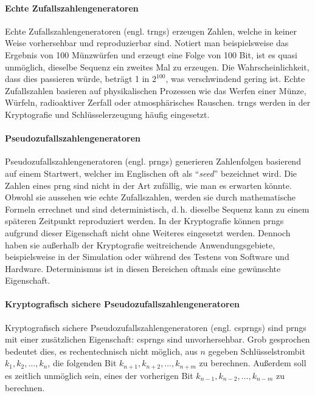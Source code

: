 \paragraph{Echte Zufallszahlengeneratoren}
Echte Zufallszahlengeneratoren (engl. \acp{trng})
erzeugen Zahlen, welche in keiner Weise vorhersehbar und reproduzierbar sind. Notiert man
beispielsweise das Ergebnis von 100 Münzwürfen und erzeugt eine Folge von 100 Bit, ist es quasi
unmöglich, dieselbe Sequenz ein zweites Mal zu erzeugen. Die Wahrscheinlichkeit,
dass dies passieren würde, beträgt 1 in $2^{100}$, was verschwindend gering ist.
Echte Zufallszahlen basieren auf physikalischen Prozessen wie das Werfen einer Münze, Würfeln,
radioaktiver Zerfall oder atmosphärisches Rauschen. \acp{trng} werden in der Kryptografie und
Schlüsselerzeugung häufig eingesetzt.

\paragraph{Pseudozufallszahlengeneratoren}
Pseudozufallszahlengeneratoren (engl. \acp{prng})
generieren Zahlenfolgen basierend auf einem Startwert, welcher im Englischen oft als
\enquote{\textit{seed}} bezeichnet wird. Die Zahlen eines \ac{prng} sind nicht
in der Art zufällig, wie man es erwarten könnte.
Obwohl sie aussehen wie echte Zufallszahlen, werden sie durch
mathematische Formeln errechnet und sind deterministisch, d.\,h. dieselbe Sequenz
kann zu einem späteren Zeitpunkt reproduziert werden.
In der Kryptografie können \acp{prng} aufgrund dieser Eigenschaft
nicht ohne Weiteres eingesetzt werden.
Dennoch haben sie außerhalb der Kryptografie weitreichende Anwendungsgebiete,
beispielsweise in der Simulation oder während des Testens von Software und Hardware.
Determinismus ist in diesen Bereichen oftmals eine gewünschte Eigenschaft.

\paragraph{Kryptografisch sichere Pseudozufallszahlengeneratoren}
Kryptografisch sichere Pseudozufallszahlengeneratoren
(engl. \acp{csprng}) sind \acp{prng} mit
einer zusätzlichen Eigenschaft: \acp{csprng} sind unvorhersehbar. Grob gesprochen
bedeutet dies, es rechentechnisch nicht möglich, aus $n$ gegeben Schlüsselstrombit
$k_1,k_2,\dots,k_n$, die folgenden Bit $k_{n+1},k_{n+2},\dots,k_{n+m}$ zu berechnen. Außerdem
soll es zeitlich unmöglich sein, eines der vorherigen Bit $k_{n-1},k_{n-2},\dots,k_{n-m}$ zu
berechnen.

